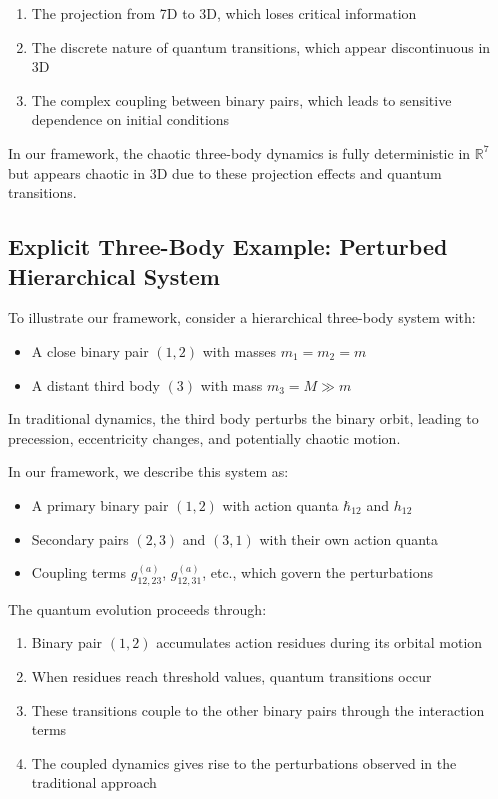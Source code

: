 \documentclass{article}
\begin{document}
\begin{enumerate}
\item The projection from 7D to 3D, which loses critical information
\item The discrete nature of quantum transitions, which appear discontinuous in 3D
\item The complex coupling between binary pairs, which leads to sensitive dependence on initial conditions
\end{enumerate}

In our framework, the chaotic three-body dynamics is fully deterministic in $\mathbb{R}^7$ but appears chaotic in 3D due to these projection effects and quantum transitions.

\subsection{Explicit Three-Body Example: Perturbed Hierarchical System}

To illustrate our framework, consider a hierarchical three-body system with:
\begin{itemize}
\item A close binary pair $(1,2)$ with masses $m_1 = m_2 = m$
\item A distant third body $(3)$ with mass $m_3 = M \gg m$
\end{itemize}

In traditional dynamics, the third body perturbs the binary orbit, leading to precession, eccentricity changes, and potentially chaotic motion.

In our framework, we describe this system as:
\begin{itemize}
\item A primary binary pair $(1,2)$ with action quanta $\hbar_{12}$ and $h_{12}$
\item Secondary pairs $(2,3)$ and $(3,1)$ with their own action quanta
\item Coupling terms $g_{12,23}^{(a)}$, $g_{12,31}^{(a)}$, etc., which govern the perturbations
\end{itemize}

The quantum evolution proceeds through:
\begin{enumerate}
\item Binary pair $(1,2)$ accumulates action residues during its orbital motion
\item When residues reach threshold values, quantum transitions occur
\item These transitions couple to the other binary pairs through the interaction terms
\item The coupled dynamics gives rise to the perturbations observed in the traditional approach
\end{enumerate}
\end{document}
